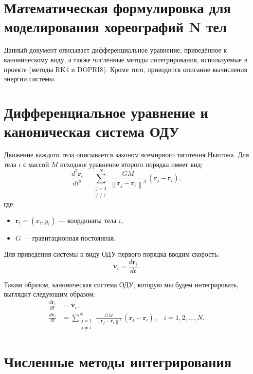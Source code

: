 \documentclass[a4paper,12pt]{article}
\begin{document}
\section*{Математическая формулировка для моделирования хореографий N тел}

Данный документ описывает дифференциальное уравнение, приведённое к каноническому виду, а также численные методы интегрирования, используемые в проекте (методы RK4 и DOPRI8). Кроме того, приводится описание вычисления энергии системы.

\section{Дифференциальное уравнение и каноническая система ОДУ}

Движение каждого тела описывается законом всемирного тяготения Ньютона. Для тела \( i \) с массой \( M \) исходное уравнение второго порядка имеет вид:
\begin{equation}\label{eq:second_order}
  \frac{d^2 \mathbf{r}_i}{dt^2} = \sum_{\substack{j=1 \\ j \neq i}}^{N} \frac{GM}{\left\lVert \mathbf{r}_j - \mathbf{r}_i \right\rVert^3} \, (\mathbf{r}_j - \mathbf{r}_i),
\end{equation}
где:
\begin{itemize}
  \item \(\mathbf{r}_i = (x_i, y_i)\) --- координаты тела \( i \),
  \item \(G\) --- гравитационная постоянная.
\end{itemize}

Для приведения системы к виду ОДУ первого порядка вводим скорость:
\begin{equation}\label{eq:velocity}
  \mathbf{v}_i = \frac{d \mathbf{r}_i}{dt}.
\end{equation}

Таким образом, каноническая система ОДУ, которую мы будем интегрировать, выглядит следующим образом:
\begin{align}
  \frac{d \mathbf{r}_i}{dt} &= \mathbf{v}_i, \label{eq:canonical1} \\
  \frac{d \mathbf{v}_i}{dt} &= \sum_{\substack{j=1 \\ j \neq i}}^{N} \frac{GM}{\left\lVert \mathbf{r}_j - \mathbf{r}_i \right\rVert^3} \, (\mathbf{r}_j - \mathbf{r}_i), \quad i = 1, 2, \dots, N. \label{eq:canonical2}
\end{align}

\section{Численные методы интегрирования}
\end{document}
